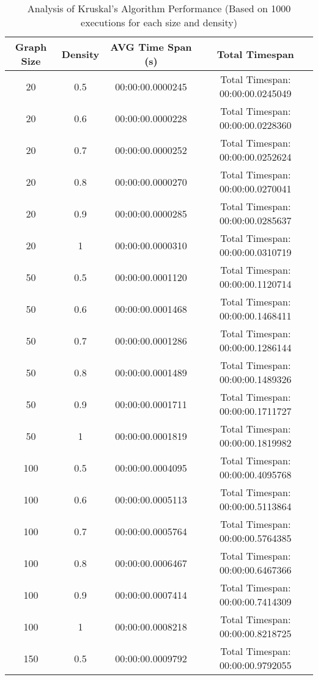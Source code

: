 \documentclass{article}
\begin{document}
\begin{table}[htbp]
    \centering
    \caption{Analysis of Kruskal's Algorithm Performance (Based on 1000 executions for each size and density)}
    \label{tab:performance}
    \begin{tabular}{cccc}
        \toprule
        \textbf{Graph Size} & \textbf{Density} & \textbf{AVG Time Span (s)} & \textbf{Total Timespan} \\
        \midrule
        20 & 0.5 & 00:00:00.0000245 & Total Timespan: 00:00:00.0245049 \\
        20 & 0.6 & 00:00:00.0000228 & Total Timespan: 00:00:00.0228360 \\
        20 & 0.7 & 00:00:00.0000252 & Total Timespan: 00:00:00.0252624 \\
        20 & 0.8 & 00:00:00.0000270 & Total Timespan: 00:00:00.0270041 \\
        20 & 0.9 & 00:00:00.0000285 & Total Timespan: 00:00:00.0285637 \\
        20 & 1 & 00:00:00.0000310 & Total Timespan: 00:00:00.0310719 \\
        \midrule
        50 & 0.5 & 00:00:00.0001120 & Total Timespan: 00:00:00.1120714 \\
        50 & 0.6 & 00:00:00.0001468 & Total Timespan: 00:00:00.1468411 \\
        50 & 0.7 & 00:00:00.0001286 & Total Timespan: 00:00:00.1286144 \\
        50 & 0.8 & 00:00:00.0001489 & Total Timespan: 00:00:00.1489326 \\
        50 & 0.9 & 00:00:00.0001711 & Total Timespan: 00:00:00.1711727 \\
        50 & 1 & 00:00:00.0001819 & Total Timespan: 00:00:00.1819982 \\
        \midrule
        100 & 0.5 & 00:00:00.0004095 & Total Timespan: 00:00:00.4095768 \\
        100 & 0.6 & 00:00:00.0005113 & Total Timespan: 00:00:00.5113864 \\
        100 & 0.7 & 00:00:00.0005764 & Total Timespan: 00:00:00.5764385 \\
        100 & 0.8 & 00:00:00.0006467 & Total Timespan: 00:00:00.6467366 \\
        100 & 0.9 & 00:00:00.0007414 & Total Timespan: 00:00:00.7414309 \\
        100 & 1 & 00:00:00.0008218 & Total Timespan: 00:00:00.8218725 \\
        \midrule
        150 & 0.5 & 00:00:00.0009792 & Total Timespan: 00:00:00.9792055 \\

\end{tabular}
\end{table}
\end{document}
